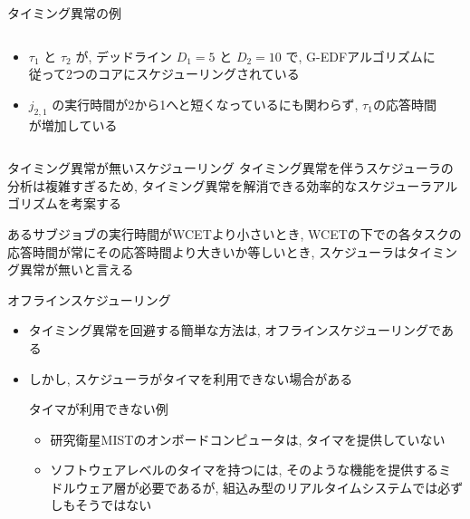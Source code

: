 \begin{frame}{タイミング異常の例}
    \begin{columns}
        \begin{column}{0.5\textwidth}
            \begin{itemize}
                \item $\tau_{1}$ と $\tau_{2}$ が, デッドライン $D_{1}=5$ と $D_{2}=10$ で, G-EDFアルゴリズムに従って2つのコアにスケジューリングされている
                \item $j_{2,1}$ の実行時間が2から1へと短くなっているにも関わらず, $\tau_1$の応答時間が増加している
            \end{itemize}
        \end{column}
        \begin{column}{0.5\textwidth}
        \end{column}
    \end{columns}
\end{frame}

\begin{frame}{タイミング異常が無いスケジューリング}
    タイミング異常を伴うスケジューラの分析は複雑すぎるため, タイミング異常を解消できる効率的なスケジューラアルゴリズムを考案する
    \begin{definition}[タイミング異常が無い]
        あるサブジョブの実行時間がWCETより小さいとき, WCETの下での各タスクの応答時間が常にその応答時間より大きいか等しいとき, スケジューラはタイミング異常が無いと言える
    \end{definition}
\end{frame}

\begin{frame}{オフラインスケジューリング}
    \begin{itemize}
        \item タイミング異常を回避する簡単な方法は, オフラインスケジューリングである
        \item しかし, スケジューラがタイマを利用できない場合がある
              \begin{block}{タイマが利用できない例}
                  \setlength{\linewidth}{0.98\columnwidth}
                  \begin{itemize}
                      \item 研究衛星MISTのオンボードコンピュータは, タイマを提供していない
                      \item ソフトウェアレベルのタイマを持つには, そのような機能を提供するミドルウェア層が必要であるが, 組込み型のリアルタイムシステムでは必ずしもそうではない
                  \end{itemize}
              \end{block}
    \end{itemize}
\end{frame}


